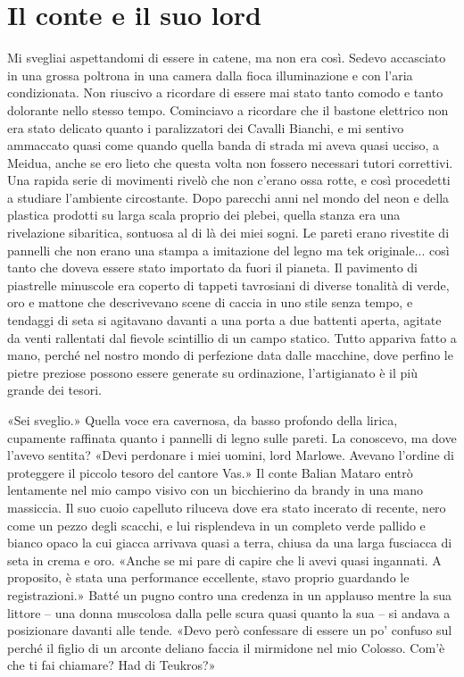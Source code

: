 \chapter{Il conte e il suo lord}

Mi svegliai aspettandomi di essere in catene, ma non era così. Sedevo
accasciato in una grossa poltrona in una camera dalla fioca
illuminazione e con l'aria condizionata. Non riuscivo a ricordare di
essere mai stato tanto comodo e tanto dolorante nello stesso tempo.
Cominciavo a ricordare che il bastone elettrico non era stato delicato
quanto i paralizzatori dei Cavalli Bianchi, e mi sentivo ammaccato quasi
come quando quella banda di strada mi aveva quasi ucciso, a Meidua,
anche se ero lieto che questa volta non fossero necessari tutori
correttivi. Una rapida serie di movimenti rivelò che non c'erano ossa
rotte, e così procedetti a studiare l'ambiente circostante. Dopo
parecchi anni nel mondo del neon e della plastica prodotti su larga
scala proprio dei plebei, quella stanza era una rivelazione sibaritica,
sontuosa al di là dei miei sogni. Le pareti erano rivestite di pannelli
che non erano una stampa a imitazione del legno ma tek originale... così
tanto che doveva essere stato importato da fuori il pianeta. Il
pavimento di piastrelle minuscole era coperto di tappeti tavrosiani di
diverse tonalità di verde, oro e mattone che descrivevano scene di
caccia in uno stile senza tempo, e tendaggi di seta si agitavano davanti
a una porta a due battenti aperta, agitate da venti rallentati dal
fievole scintillio di un campo statico. Tutto appariva fatto a mano,
perché nel nostro mondo di perfezione data dalle macchine, dove perfino
le pietre preziose possono essere generate su ordinazione, l'artigianato
è il più grande dei tesori.

«Sei sveglio.» Quella voce era cavernosa, da basso profondo della
lirica, cupamente raffinata quanto i pannelli di legno sulle {pareti}.
La conoscevo, ma dove l'avevo sentita? «Devi perdonare i miei uomini,
lord Marlowe. Avevano l'ordine di proteggere il piccolo tesoro del
cantore Vas.» Il conte Balian Mataro entrò lentamente nel mio campo
visivo con un bicchierino da brandy in una mano massiccia. Il suo cuoio
capelluto riluceva dove era stato incerato di recente, nero come un
pezzo degli scacchi, e lui risplendeva in un completo verde pallido e
bianco opaco la cui giacca arrivava quasi a terra, chiusa da una larga
fusciacca di seta in crema e oro. «Anche se mi pare di capire che li
avevi quasi ingannati. A proposito, è stata una performance eccellente,
stavo proprio guardando le registrazioni.» Batté un pugno contro una
credenza in un applauso mentre la sua littore -- una donna muscolosa
dalla pelle scura quasi quanto la sua -- si andava a posizionare davanti
alle tende. «Devo però confessare di essere un po' confuso sul perché il
figlio di un arconte deliano faccia il mirmidone nel mio Colosso. Com'è
che ti fai chiamare? Had di Teukros?»

